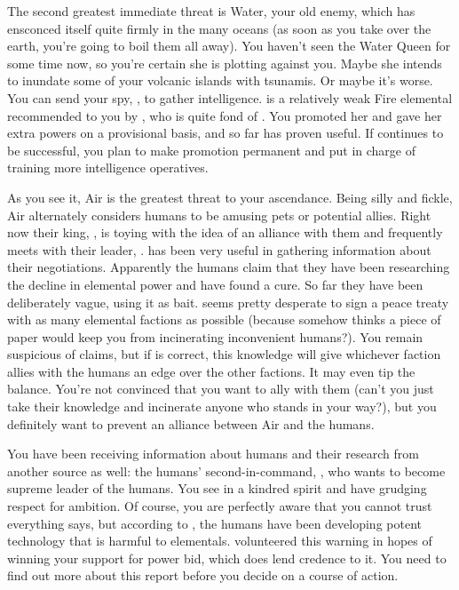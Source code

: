 \documentclass[char]{elementals}
\begin{document}
The second greatest immediate threat is Water, your old enemy, which has ensconced itself quite firmly in the many oceans (as soon as you take over the earth, you're going to boil them all away).  You haven't seen the Water Queen for some time now, so you're certain she is plotting against you.  Maybe she intends to inundate some of your volcanic islands with tsunamis.  Or maybe it's worse.  You can send your spy, \cJuliet{\intro}, to gather intelligence.  \cJuliet{\They} is a relatively weak Fire elemental recommended to you by \cPyro{}, who is quite fond of \cJuliet{\them}.  You promoted her and gave her extra powers on a provisional basis, and so far \cJuliet{\they} has proven useful.  If \cJuliet{\they} continues to be successful, you plan to make \cJuliet{\their} promotion permanent and put \cJuliet{\their} in charge of training more intelligence operatives.

As you see it, Air is the greatest threat to your ascendance.  Being silly and fickle, Air alternately considers humans to be amusing pets or potential allies.  Right now their king, \cKing{\intro}, is toying with the idea of an alliance with them and frequently meets with their leader, \cLeader{\intro}.  \cJuliet{} has been very useful in gathering information about their negotiations.  Apparently the humans claim that they have been researching the decline in elemental power and have found a cure.  So far they have been deliberately vague, using it as bait.  \cLeader{} seems pretty desperate to sign a peace treaty with as many elemental factions as possible (because somehow \cLeader{\they} thinks a piece of paper would keep you from incinerating inconvenient humans?).  You remain suspicious of \cLeader{\their} claims, but if \cLeader{\they} is correct, this knowledge will give whichever faction allies with the humans an edge over the other factions.  It may even tip the balance.  You're not convinced that you want to ally with them (can't you just take their knowledge and incinerate anyone who stands in your way?), but you definitely want to prevent an alliance between Air and the humans.

You have been receiving information about humans and their research from another source as well: the humans' second-in-command, \cDema{\intro}, who wants to become supreme leader of the humans.  You see in \cDema{\them} a kindred spirit and have grudging respect for \cDema{\their} ambition.  Of course, you are perfectly aware that you cannot trust everything \cDema{\they} says, but according to \cDema{\them}, the humans have been developing potent technology that is harmful to elementals.  \cDema{\They} volunteered this warning in hopes of winning your support for \cDema{\their} power bid, which does lend credence to it.  You need to find out more about this report before you decide on a course of action. 
\end{document}
